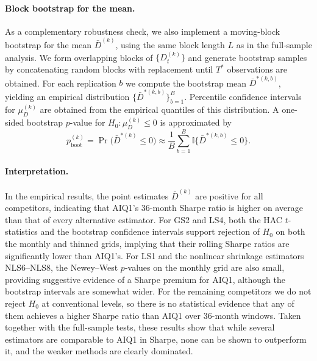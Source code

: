 \documentclass[12pt,letterpaper]{article}
\begin{document}
\paragraph{Block bootstrap for the mean.}  
As a complementary robustness check, we also implement a moving-block bootstrap for the mean \(\bar{D}^{(k)}\), using the same block length \(L\) as in the full-sample analysis. We form overlapping blocks of \(\{D_{t}^{(k)}\}\) and generate bootstrap samples by concatenating random blocks with replacement until \(T^{*}\) observations are obtained. For each replication \(b\) we compute the bootstrap mean \(\bar{D}^{*(k,b)}\), yielding an empirical distribution \(\{\bar{D}^{*(k,b)}\}_{b=1}^{B}\). Percentile confidence intervals for \(\mu_{D}^{(k)}\) are obtained from the empirical quantiles of this distribution. A one-sided bootstrap \(p\)-value for \(H_{0}:\mu_{D}^{(k)} \le 0\) is approximated by
\[
p^{(k)}_{\text{boot}} 
= \Pr\bigl(\bar{D}^{*(k)} \le 0\bigr)
\approx \frac{1}{B}\sum_{b=1}^{B} \mathbb{I}\{\bar{D}^{*(k,b)} \le 0\}.
\]

\paragraph{Interpretation.}  
In the empirical results, the point estimates \(\bar{D}^{(k)}\) are positive for all competitors, indicating that AIQ1’s 36-month Sharpe ratio is higher on average than that of every alternative estimator. For GS2 and LS4, both the HAC \(t\)-statistics and the bootstrap confidence intervals support rejection of \(H_{0}\) on both the monthly and thinned grids, implying that their rolling Sharpe ratios are significantly lower than AIQ1’s. For LS1 and the nonlinear shrinkage estimators NLS6–NLS8, the Newey–West \(p\)-values on the monthly grid are also small, providing suggestive evidence of a Sharpe premium for AIQ1, although the bootstrap intervals are somewhat wider. For the remaining competitors we do not reject \(H_{0}\) at conventional levels, so there is no statistical evidence that any of them achieves a higher Sharpe ratio than AIQ1 over 36-month windows. Taken together with the full-sample tests, these results show that while several estimators are comparable to AIQ1 in Sharpe, none can be shown to outperform it, and the weaker methods are clearly dominated.
\end{document}
